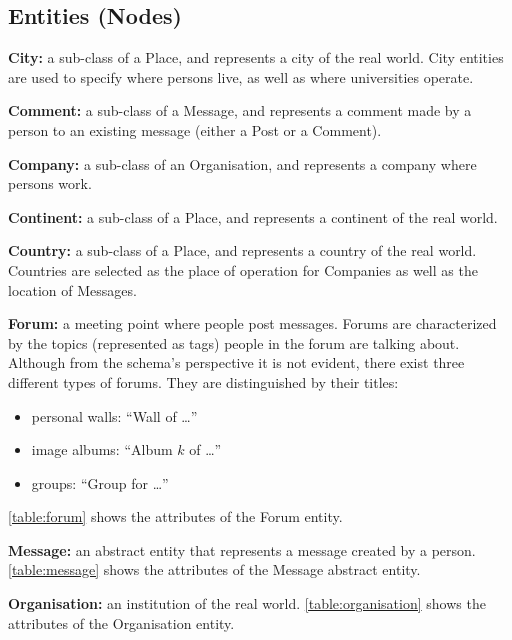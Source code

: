 \subsection{Entities (Nodes)}

{\flushleft \textbf{City:}} a sub-class of a Place, and represents a
city of the real world. City entities are used to specify where persons live,
as well as where universities operate.

{\flushleft \textbf{Comment:}} a sub-class of a Message, and represents a
comment made by a person to an existing message (either a Post or a Comment).

{\flushleft \textbf{Company:}} a sub-class of an Organisation, and represents a company where persons work.

{\flushleft \textbf{Continent:}} a sub-class of a Place, and represents a continent of the real world.

{\flushleft \textbf{Country:}} a sub-class of a Place, and represents a country of the real world.
Countries are selected as the place of operation for Companies as well as the location of Messages.

{\flushleft \textbf{Forum:}} a meeting point where people
post messages. Forums are characterized by the topics (represented as tags)
people in the forum are talking about. Although from the schema's perspective
it is not evident, there exist three different types of
forums.  They are distinguished by their titles:

\begin{itemize}
    \item personal walls: ``Wall of \ldots''
    \item image albums: ``Album $k$ of \ldots''
    \item groups: ``Group for \ldots''
\end{itemize}

\autoref{table:forum} shows the attributes of the Forum entity.



{\flushleft \textbf{Message:}} an abstract entity that represents a message
created by a person. \autoref{table:message} shows the attributes of the Message
abstract entity.



{\flushleft \textbf{Organisation:}} an institution of the real
world. \autoref{table:organisation} shows the attributes of the Organisation
entity.



